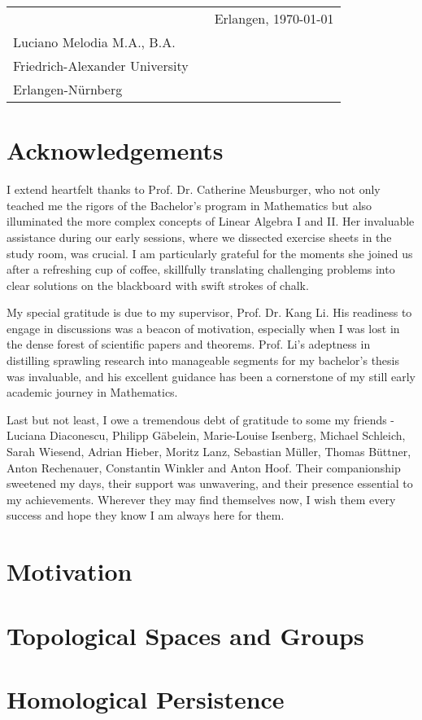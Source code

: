\documentclass[b5paper, 12pt, twoside]{report}
\begin{document}
	\vspace{2cm}
	\begin{tabular}{@{}p{3.5in}p{2in}p{2in}@{}}
		\hrulefill                    &  & Erlangen, \today \\
		Luciano Melodia M.A., B.A.    &  &                  \\
		Friedrich-Alexander University \\
		Erlangen-Nürnberg
	\end{tabular}

	\chapter*{Acknowledgements}

	I extend heartfelt thanks to Prof. Dr. Catherine Meusburger, who not only teached
	me the rigors of the Bachelor's program in Mathematics but also illuminated the
	more complex concepts of Linear Algebra I and II. Her invaluable assistance
	during our early sessions, where we dissected exercise sheets in the study room,
	was crucial. I am particularly grateful for the moments she joined us after a refreshing
	cup of coffee, skillfully translating challenging problems into clear
	solutions on the blackboard with swift strokes of chalk.

	My special gratitude is due to my supervisor, Prof. Dr. Kang Li. His readiness
	to engage in discussions was a beacon of motivation, especially when I was lost
	in the dense forest of scientific papers and theorems. Prof. Li's adeptness in
	distilling sprawling research into manageable segments for my bachelor's thesis
	was invaluable, and his excellent guidance has been a cornerstone of my still
	early academic journey in Mathematics.

	Last but not least, I owe a tremendous debt of gratitude to some my friends - Luciana
	Diaconescu, Philipp Gäbelein, Marie-Louise Isenberg, Michael Schleich, Sarah Wiesend,
	Adrian Hieber, Moritz Lanz, Sebastian Müller, Thomas Büttner, Anton Rechenauer,
	Constantin Winkler and Anton Hoof. Their companionship sweetened my days, their
	support was unwavering, and their presence essential to my achievements. Wherever
	they may find themselves now, I wish them every success and hope they know I
	am always here for them.

	\newpage
	\tableofcontents

	\singlespacing
	\chapter{Motivation}
	

	\chapter{Topological Spaces and Groups}
	

	\chapter{Homological Persistence}
	

	\singlespacing
	\printbibliography

	\newpage
	\printindex
\end{document}
